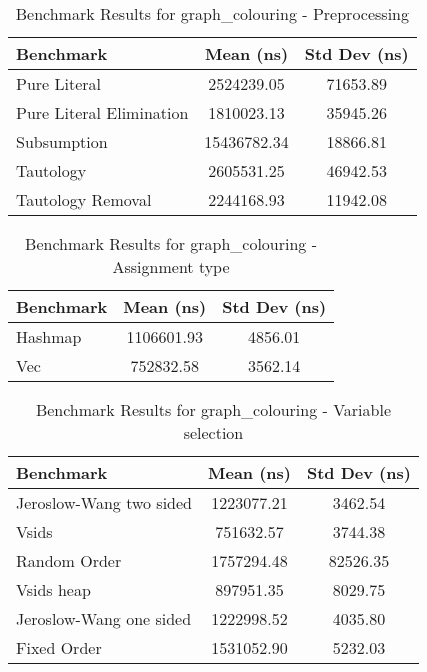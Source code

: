 \begin{table}[h]
    \centering
    \caption{Benchmark Results for graph\_colouring - Preprocessing}
    \begin{tabular}{|l|c|c|}
        \hline
        Benchmark & Mean (ns) & Std Dev (ns) \\
        \hline
        Pure Literal & 2524239.05 & 71653.89 \\
        Pure Literal Elimination & 1810023.13 & 35945.26 \\
        Subsumption & 15436782.34 & 18866.81 \\
        Tautology & 2605531.25 & 46942.53 \\
        Tautology Removal & 2244168.93 & 11942.08 \\
        \hline
    \end{tabular}
\label{tab:bench-graph_colouring---Preprocessing}
\end{table}


\begin{table}[h]
    \centering
    \caption{Benchmark Results for graph\_colouring - Assignment type}
    \begin{tabular}{|l|c|c|}
        \hline
        Benchmark & Mean (ns) & Std Dev (ns) \\
        \hline
        Hashmap & 1106601.93 & 4856.01 \\
        Vec & 752832.58 & 3562.14 \\
        \hline
    \end{tabular}
\label{tab:bench-graph_colouring---Assignment-type}
\end{table}


\begin{table}[h]
    \centering
    \caption{Benchmark Results for graph\_colouring - Variable selection}
    \begin{tabular}{|l|c|c|}
        \hline
        Benchmark & Mean (ns) & Std Dev (ns) \\
        \hline
        Jeroslow-Wang two sided & 1223077.21 & 3462.54 \\
        Vsids & 751632.57 & 3744.38 \\
        Random Order & 1757294.48 & 82526.35 \\
        Vsids heap & 897951.35 & 8029.75 \\
        Jeroslow-Wang one sided & 1222998.52 & 4035.80 \\
        Fixed Order & 1531052.90 & 5232.03 \\
        \hline
    \end{tabular}
\label{tab:bench-graph_colouring---Variable-selection}
\end{table}


